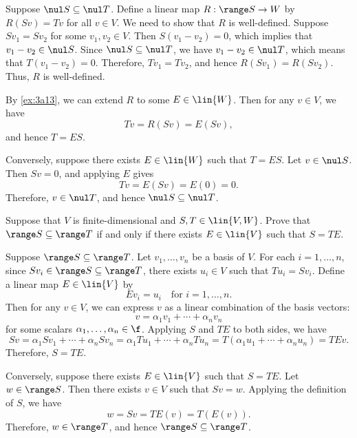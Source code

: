 \begin{sol}
    Suppose $\nul S \subseteq \nul T$. Define a linear map $R: \range S \to W$ by $R(Sv) = Tv$ for all $v \in V$. We need to show that $R$ is well-defined. Suppose $Sv_1 = Sv_2$ for some $v_1, v_2 \in V$. Then $S(v_1 - v_2) = 0$, which implies that $v_1 - v_2 \in \nul S$. Since $\nul S \subseteq \nul T$, we have $v_1 - v_2 \in \nul T$, which means that $T(v_1 - v_2) = 0$. Therefore, $Tv_1 = Tv_2$, and hence $R(Sv_1) = R(Sv_2)$. Thus, $R$ is well-defined.

    By \autoref{ex:3a13}, we can extend $R$ to some $E \in \lin{W}$. Then for any $v \in V$, we have
    \[Tv = R(Sv) = E(Sv),\]
    and hence $T = ES$.

    Conversely, suppose there exists $E \in \lin{W}$ such that $T = ES$. Let $v \in \nul S$. Then $Sv = 0$, and applying $E$ gives
    \[Tv = E(Sv) = E(0) = 0.\]
    Therefore, $v \in \nul T$, and hence $\nul S \subseteq \nul T$.
\end{sol}

\begin{exercise}[3b26]
    Suppose that $V$ is finite-dimensional and $S, T \in \lin{V, W}$. Prove that $\range S \subseteq \range T$ if and only if there exists $E \in \lin{V}$ such that $S = TE$.

\end{exercise}

\begin{sol}
    Suppose $\range S \subseteq \range T$. Let $v_1, \ldots, v_n$ be a basis of $V$. For each $i = 1, \ldots, n$, since $Sv_i \in \range S \subseteq \range T$, there exists $u_i \in V$ such that $Tu_i = Sv_i$. Define a linear map $E \in \lin{V}$ by
    \[Ev_i = u_i \quad \text{for } i = 1, \ldots, n.\]
    Then for any $v \in V$, we can express $v$ as a linear combination of the basis vectors:
    \[v = \alpha_1 v_1 + \cdots + \alpha_n v_n\]
    for some scalars $\alpha_1, \ldots, \alpha_n \in \f$. Applying $S$ and $TE$ to both sides, we have
    \[Sv = \alpha_1 Sv_1 + \cdots + \alpha_n Sv_n = \alpha_1 Tu_1 + \cdots + \alpha_n Tu_n = T(\alpha_1 u_1 + \cdots + \alpha_n u_n) = TEv.\]
    Therefore, $S = TE$.

    Conversely, suppose there exists $E \in \lin{V}$ such that $S = TE$. Let $w \in \range S$. Then there exists $v \in V$ such that $Sv = w$. Applying the definition of $S$, we have
    \[w = Sv = TE(v) = T(E(v)).\]
    Therefore, $w \in \range T$, and hence $\range S \subseteq \range T$.
\end{sol}

